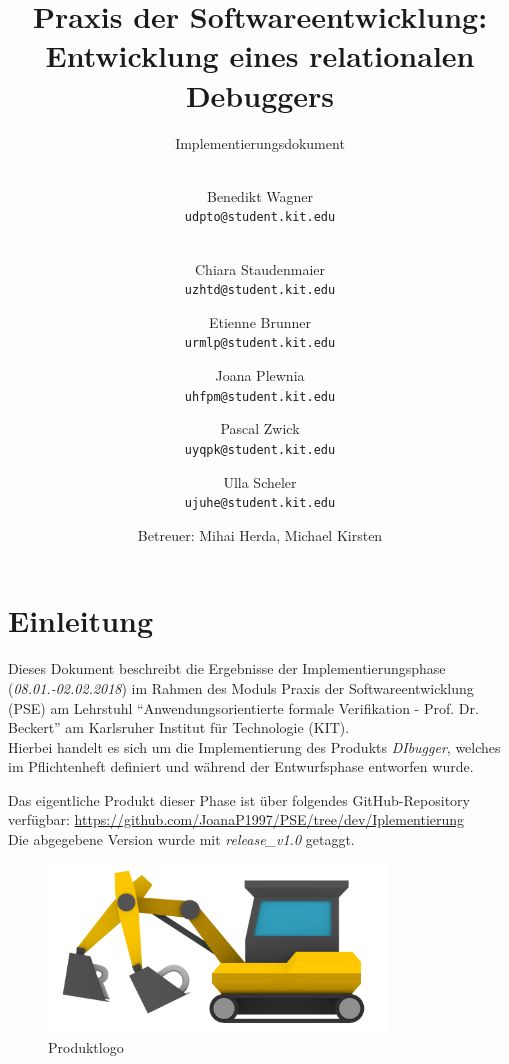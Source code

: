 \documentclass[parskip=full]{scrartcl}
\title{
	\vspace{2cm}
	\myfont 
	Praxis der Softwareentwicklung:\\ 
	Entwicklung eines relationalen Debuggers\\
}
\subtitle{
	\vspace{1cm}
	\myfont
	Implementierungsdokument
}
\author{
	\vspace{1cm} \\
	Benedikt Wagner\\
	\texttt{udpto@student.kit.edu}
	\and \vspace{1cm} \\ Chiara Staudenmaier\\
	\texttt{uzhtd@student.kit.edu}
	\and Etienne Brunner\\
	\texttt{urmlp@student.kit.edu}
	\and Joana Plewnia\\
	\texttt{uhfpm@student.kit.edu} 
	\and Pascal Zwick\\
	\texttt{uyqpk@student.kit.edu}
	\and Ulla Scheler\\
	\texttt{ujuhe@student.kit.edu}
	\vspace{1cm}
	\and Betreuer: Mihai Herda, Michael Kirsten
	\vspace{4cm}
}
\begin{document}
\clearpage
\maketitle
{}
\newpage

\tableofcontents
\newpage
{}

\section{Einleitung}
Dieses Dokument beschreibt die Ergebnisse der Implementierungsphase (\textit{08.01.-02.02.2018}) im Rahmen des Moduls Praxis der Softwareentwicklung (PSE) am Lehrstuhl \enquote{Anwendungsorientierte formale Verifikation - Prof. Dr. Beckert} am Karlsruher Institut für Technologie (KIT).\\
Hierbei handelt es sich um die Implementierung des Produkts \textit{DIbugger}, welches im Pflichtenheft definiert und während der Entwurfsphase entworfen wurde.

Das eigentliche Produkt dieser Phase ist über folgendes GitHub-Repository verfügbar: \href{https://github.com/JoanaP1997/PSE/tree/dev/Iplementierung}{https://github.com/JoanaP1997/PSE/tree/dev/Iplementierung} \\
Die abgegebene Version wurde mit \textit{release\_v1.0} getaggt.

\begin{figure}[!h]
\centering
\includegraphics[width=0.8\textwidth]{../Plichtenheft/logo_nongi.png}
\caption{Produktlogo}
\end{figure}
\end{document}
